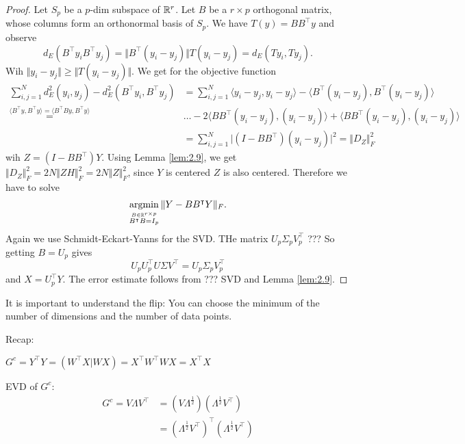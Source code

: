 \begin{proof}
    Let $S_p$ be a $p$-dim subspace of $\mathbb{R}^r$. Let $B$ be a $r\times p$ orthogonal matrix, whose 
    columns form an orthonormal basis of $S_p$. We have $T(y)=BB^\intercal y$ and observe 
    \[d_E(B^\intercal y_i B^\intercal y_j)=\Vert B^{\intercal}(y_i-y_j)\Vert T(y_i-y_j)=d_E(Ty_i,Ty_j).\] 
    Wih $\Vert y_i-y_j\Vert\geq \Vert T (y_i-y_j)\Vert$. We get for the objective function 
    \begin{align*}
        \sum_{i,j=1}^N d_E^2(y_i,y_j)-d_E^2(B^\intercal y_i,B^\intercal y_j)&=\sum_{i,j=1}^N \langle y_i-y_j,y_i-y_j\rangle-\langle B^\intercal (y_i-y_j),B^\intercal(y_i-y_j)\rangle\\
        \stackrel{\langle B^\intercal y,B^\intercal y\rangle=\langle B^\intercal By, B^\intercal y\rangle}{=}&\dots - 2 \langle BB^\intercal (y_i-y_j),(y_i-y_j)\rangle + \langle BB^\intercal (y_i-y_j),(y_i-y_j)\rangle\\
        &=\sum_{i,j=1}^N \vert (I-BB^\intercal)(y_i-y_j)\vert^2=\Vert D_Z\Vert_F^2
    \end{align*}
    wih $Z=(I-BB^\intercal)Y$. Using Lemma \ref{lem:2.9}, we get $\Vert D_Z\Vert_F^2=2N\Vert ZH\Vert_F^2=2N\Vert Z\Vert_F^2$, 
    since $Y$ is centered $Z$ is also centered. Therefore we have to solve 
    \[\operatorname*{\text{argmin}}_{\stackrel{B\in\mathbb{R}^{r\times p}}{B^\intercal B=I_p}}\Vert Y-BB^\intercal Y\Vert_F.\]
    Again we use Schmidt-Eckart-Yanns for the SVD. THe matrix $U_p \Sigma_pV_p^\intercal$ ??? So getting $B=U_p$ gives 
    \[U_pU_p^\intercal U\Sigma V^\intercal  = U_p\Sigma_pV_p^\intercal\] and 
    $X=U_p^\intercal Y$. The error estimate follows from ??? SVD and Lemma \ref{lem:2.9}.
\end{proof}

It is important to understand the flip: You can choose the minimum of the number of dimensions and the number of data points.


Recap:

$G^c=Y^\intercal Y=(W^\intercal X| W X)=X^\intercal W^\intercal W X = X^\intercal X$

EVD of $G^c$:
\begin{align*}
    G^c=V\Lambda V^\intercal &= (V \Lambda^{\frac{1}{2}})(\Lambda^{\frac{1}{2}} V^\intercal)\\
    &=(\Lambda^{\frac{1}{2}} V^\intercal)^\intercal (\Lambda^{\frac{1}{2}} V^\intercal)
\end{align*}

